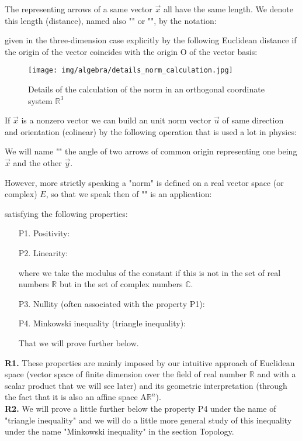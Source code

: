 	The representing arrows of a same vector $\vec{x}$ all have the same length. We denote this length (distance), named also "\label{vector norm}" or "", by the notation:
	
	given in the three-dimension case explicitly by the following Euclidean distance\label{euclidean distance vector} if the origin of the vector coincides with the origin O of the vector basis:
	
	\begin{figure}[H]
		\centering
		\texttt{[image: img/algebra/details\_norm\_calculation.jpg]}
		\caption{Details of the calculation of the norm in an orthogonal coordinate system $\mathbb{R}^3$}
	\end{figure}
	If $\vec{x}$ is a nonzero vector we can build an unit norm vector $\vec{u}$ of same direction and orientation (colinear) by the following operation that is used a lot in physics:
	
	We will name "" the angle of two arrows of common origin representing one being $\vec{x}$ and the other $\vec{y}$.
	
	However, more strictly speaking a "norm" is defined on a real vector space (or complex) $E$, so that we speak then of "" is an application:
	
	satisfying the following properties:
	\begin{enumerate}
		\item[P1.] Positivity:
		
		\item[P2.] Linearity:
		
		where we take the modulus of the constant if this is not in the set of real numbers $\mathbb{R}$ but in the set of complex numbers $\mathbb{C}$.
		\item[P3.] Nullity (often associated with the property P1):
		
		\item[P4.] Minkowski inequality (triangle inequality):
		
		That we will prove further below.
	\end{enumerate}
	\begin{tcolorbox}[title=Remarks,colframe=black,arc=10pt]
	\textbf{R1.} These properties are mainly imposed by our intuitive approach of Euclidean space (vector space of finite dimension over the field of real number $\mathbb{R}$ and with a scalar product that we will see later) and its geometric interpretation (through the fact that it is also an affine space $\text{A}\mathbb{R}^n$).\\
	
	\textbf{R2.} We will prove a little further below the property P4 under the name of "triangle inequality" and we will do a little more general study of this inequality under the name "Minkowski inequality" in the section Topology.
	\end{tcolorbox}	
	
